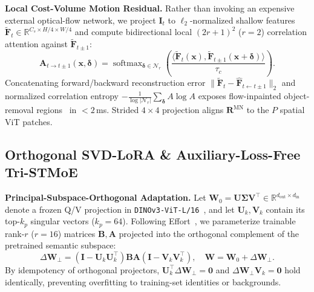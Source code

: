 \documentclass[10pt,twocolumn]{article}
\begin{document}
\noindent\textbf{Local Cost-Volume Motion Residual.} Rather than invoking an expensive external optical-flow network, we project $\mathbf{I}_t$ to $\ell_2$-normalized shallow features $\tilde{\mathbf{F}}_t \in \mathbb{R}^{C_s \times H/4 \times W/4}$ and compute bidirectional local $(2r+1)^2$ ($r=2$) correlation attention against $\tilde{\mathbf{F}}_{t\pm 1}$:
\begin{equation}
    \mathbf{A}_{t \to t\pm 1}(\mathbf{x}, \boldsymbol{\delta}) = \operatorname{softmax}_{\boldsymbol{\delta} \in \mathcal{N}_r}\!\left(\frac{\langle \tilde{\mathbf{F}}_t(\mathbf{x}), \tilde{\mathbf{F}}_{t\pm 1}(\mathbf{x}+\boldsymbol{\delta})\rangle}{\tau_c}\right).
\end{equation}
Concatenating forward/backward reconstruction error $\|\tilde{\mathbf{F}}_t - \hat{\mathbf{F}}_{t\leftarrow t\pm 1}\|_2$ and normalized correlation entropy $-\frac{1}{\log|\mathcal{N}_r|}\sum_{\boldsymbol{\delta}} A \log A$ exposes flow-inpainted object-removal regions~\cite{zhou2023propainter} in $<2$\,ms. Strided $4\times 4$ projection aligns $\mathbf{R}^{\text{MN}}$ to the $P$ spatial ViT patches.

\subsection{Orthogonal SVD-LoRA \& Auxiliary-Loss-Free Tri-STMoE}
\label{subsec:moe}
\noindent\textbf{Principal-Subspace-Orthogonal Adaptation.} Let $\mathbf{W}_0 = \mathbf{U}\boldsymbol{\Sigma}\mathbf{V}^\top \in \mathbb{R}^{d_{\text{out}}\times d_{\text{in}}}$ denote a frozen Q/V projection in \texttt{DINOv3-ViT-L/16}~\cite{simeoni2025dinov3}, and let $\mathbf{U}_k, \mathbf{V}_k$ contain its top-$k_p$ singular vectors ($k_p=64$). Following Effort~\cite{yan2025effort}, we parameterize trainable rank-$r$ ($r=16$) matrices $\mathbf{B}, \mathbf{A}$ projected into the orthogonal complement of the pretrained semantic subspace:
\begin{equation}
    \Delta\mathbf{W}_\perp = (\mathbf{I} - \mathbf{U}_k\mathbf{U}_k^\top)\mathbf{B}\mathbf{A}(\mathbf{I} - \mathbf{V}_k\mathbf{V}_k^\top), \quad \mathbf{W} = \mathbf{W}_0 + \Delta\mathbf{W}_\perp.
    \label{eq:ortholora}
\end{equation}
By idempotency of orthogonal projectors, $\mathbf{U}_k^\top \Delta\mathbf{W}_\perp = \mathbf{0}$ and $\Delta\mathbf{W}_\perp \mathbf{V}_k = \mathbf{0}$ hold identically, preventing overfitting to training-set identities or backgrounds.
\end{document}
